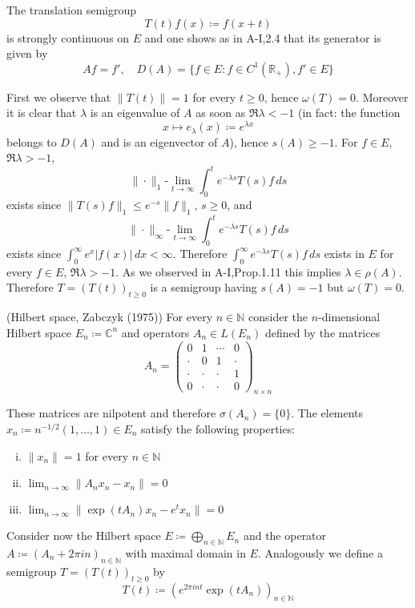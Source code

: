 \newpage

The translation semigroup
\[
    T(t)f(x) \coloneqq f(x+t)
\]
is strongly continuous on $E$ and one shows as in A-I,2.4 that its generator is given by
\[
    Af = f', \quad D(A) = \{ f \in E : f \in C^{1}(\mathbb{R}_{+}), f' \in E \}
\]

First we observe that $\|T(t)\| = 1$ for every $t \geq 0$, hence $\omega(T) = 0$.
Moreover it is clear that $\lambda$ is an eigenvalue of $A$ as soon as $\Re\lambda < -1$ (in fact: the function
\[
    x \mapsto e_{\lambda}(x) \coloneqq e^{\lambda x}
\]
belongs to $D(A)$ and is an eigenvector of $A$), hence $s(A) \geq -1$.
For $f \in E$, $\Re\lambda > -1$,
\[
    \|\cdot\|_{1}\text{-}\lim_{t \to \infty} \int_{0}^{t} e^{-\lambda s}T(s)f \, ds
\]
exists since $\|T(s)f\|_{1} \leq e^{-s}\|f\|_{1}$, $s \geq 0$, and
\[
    \|\cdot\|_{\infty}\text{-}\lim_{t \to \infty} \int_{0}^{t} e^{-\lambda s}T(s)f \, ds
\]
exists since $\int_{0}^{\infty} e^{x}|f(x)| \, dx < \infty$.
Therefore $\int_{0}^{\infty} e^{-\lambda s}T(s)f \, ds$ exists in $E$ for every $f \in E$, $\Re\lambda > -1$.
As we observed in A-I,Prop.1.11 this implies $\lambda \in \rho(A)$.
Therefore $T = (T(t))_{t\geq 0}$ is a semigroup having $s(A) = -1$ but $\omega(T) = 0$.
\begin{example}\label{ex:a3-1.4}
(Hilbert space, Zabczyk (1975))
For every $n \in \mathbb{N}$ consider the $n$-dimensional Hilbert space $E_{n} \coloneqq \mathbb{C}^{n}$ and operators $A_{n} \in L(E_{n})$ defined by the matrices
\[
    A_{n} = \begin{pmatrix}
    0 & 1 & \cdots & 0 \\
    \cdot & 0 & 1 & \cdot \\
    \cdot & \cdot & \cdot & 1 \\
    0 & \cdot & \cdot & 0
    \end{pmatrix}_{n \times n}
\]

These matrices are nilpotent and therefore $\sigma(A_{n}) = \{0\}$.
The elements $x_{n} \coloneqq n^{-1/2}(1, \ldots, 1) \in E_{n}$ satisfy the following properties:

\begin{enumerate}[(i)]
\item 
$\|x_{n}\| = 1$ for every $n \in \mathbb{N}$

\item 
$\lim_{n \to \infty} \|A_{n}x_{n} - x_{n}\| = 0$

\item 
$\lim_{n \to \infty} \|\exp(tA_{n})x_{n} - e^{t}x_{n}\| = 0$

\end{enumerate}
Consider now the Hilbert space $E \coloneqq \bigoplus_{n \in \mathbb{N}} E_{n}$ and the operator $A \coloneqq (A_{n} + 2\pi in)_{n \in \mathbb{N}}$ with maximal domain in $E$.
Analogously we define a semigroup $T = (T(t))_{t \geq 0}$ by
\[
    T(t) \coloneqq (e^{2\pi int}\exp(tA_{n}))_{n \in \mathbb{N}}
\]
\end{example}

